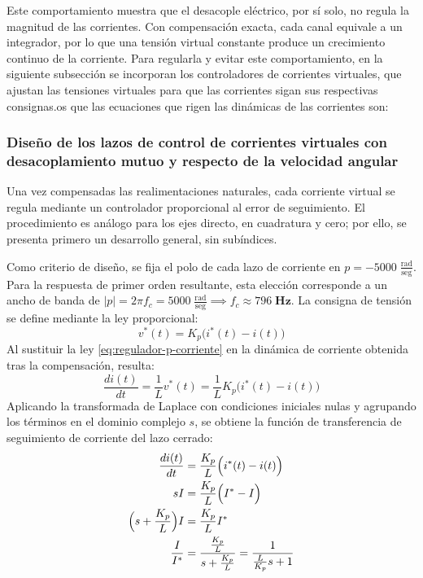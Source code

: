 \documentclass[blue,fullpaper]{ludusofficial}  %
\begin{document}
Este comportamiento muestra que el desacople eléctrico,
por sí solo, no regula la magnitud de las corrientes. Con
compensación exacta, cada canal equivale a un integrador,
por lo que una tensión virtual constante produce un crecimiento
continuo de la corriente. Para regularla y evitar este
comportamiento, en la siguiente subsección se incorporan los
controladores de corrientes virtuales, que ajustan las tensiones
virtuales para que las corrientes sigan sus respectivas consignas.os que las ecuaciones que rigen las dinámicas de las corrientes son:






\subsubsection{Diseño de los lazos de control de corrientes virtuales con desacoplamiento mutuo y respecto de la velocidad angular}

Una vez compensadas las realimentaciones naturales, cada corriente virtual se regula mediante un controlador proporcional al error de seguimiento. El procedimiento es análogo para los ejes directo, en cuadratura y cero; por ello, se presenta primero un desarrollo general, sin subíndices.

Como criterio de diseño, se fija el polo de cada lazo de corriente en $p=-5000\;\frac{\text{rad}}{\text{seg}}$. Para la respuesta de primer orden resultante, esta elección corresponde a un ancho de banda de $|p|=2\pi f_c=5000\;\frac{\text{rad}}{\text{seg}} \implies f_c \approx 796\; \textbf{Hz}$. La consigna de tensión se define mediante la ley proporcional:
\begin{equation}
\label{eq:regulador-p-corriente}
v^{*}(t) = K_{p} \Big( i^{*}(t) -i(t) \Big)
\end{equation}
Al sustituir la ley \eqref{eq:regulador-p-corriente} en la dinámica de corriente obtenida tras la compensación, resulta:
\[
\frac{di(t)}{dt} = \frac{1}{L} v^{*}(t) =  \frac{1}{L} K_{p} \Big( i^{*}(t) -i(t) \Big)
\]
Aplicando la transformada de Laplace con condiciones iniciales nulas y agrupando los términos en el dominio complejo $s$, se obtiene la función de transferencia de seguimiento de corriente del lazo cerrado:
\begin{align}
\frac{di(t)}{dt}  & = \frac{K_{p}}{L}  \Big( i^{*}(t) -i(t) \Big)
\notag \\
sI & = \frac{K_{p}}{L} \Big( I^{*} - I \Big)
\notag \\
\Big( s + \frac{K_{p}}{L} \Big) I & = \frac{K_{p}}{L} I^{*}
\notag \\
\frac{I}{I^{*}} & = \frac{\frac{K_{p}}{L}}{s+\frac{K_{p}}{L}}=\frac{1}{\frac{L}{K_{p}}s+1}
\label{eq:transferencia-corriente-general}
\end{align}
\end{document}
